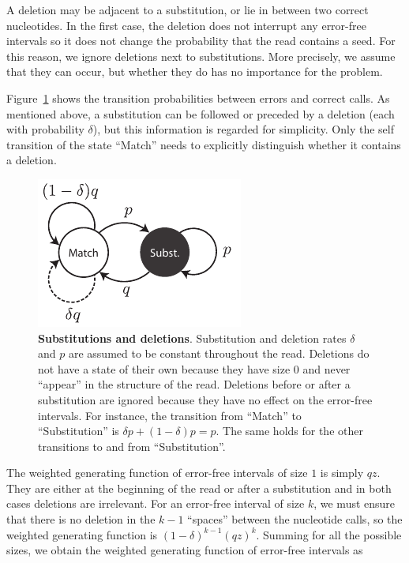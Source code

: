 \documentclass{article}
\begin{document}
A deletion may be adjacent to a substitution, or lie in between two
correct nucleotides. In the first case, the deletion does not interrupt
any error-free intervals so it does not change the probability that the
read contains a seed. For this reason, we ignore deletions next to
substitutions. More precisely, we assume that they can occur, but whether
they do has no importance for the problem.

Figure~\ref{fig:deletions}
shows the transition probabilities between errors and correct calls. As
mentioned above, a substitution can be followed or preceded by a deletion
(each with probability $\delta$), but this information is regarded for
simplicity. Only the self transition of the state ``Match'' needs to
explicitly distinguish whether it contains a deletion.

\begin{figure}[h]
\centering
\includegraphics[scale=0.9]{deletions.pdf}
\caption{\textbf{Substitutions and deletions}. 
Substitution and deletion rates $\delta$ and $p$ are assumed to be
constant throughout the read. Deletions do not have a state of their own
because they have size $0$ and never ``appear'' in the structure of the
read. Deletions before or after a substitution are ignored because they
have no effect on the error-free intervals. For instance, the transition
from ``Match'' to ``Substitution'' is $\delta p + (1-\delta)p = p$. The
same holds for the other transitions to and from ``Substitution''.}
\label{fig:deletions}
\end{figure}

The weighted generating function of error-free intervals of size $1$ is
simply $qz$. They are either at the beginning of the read or after a
substitution and in both cases deletions are irrelevant. For an error-free
interval of size $k$, we must ensure that there is no deletion in the
$k-1$ ``spaces'' between the nucleotide calls, so the weighted generating
function is $(1-\delta)^{k-1}(qz)^k$. Summing for all the possible sizes,
we obtain the weighted generating function of error-free intervals as
\end{document}
